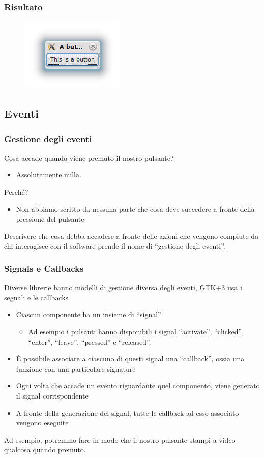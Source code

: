 \documentclass{beamer}
\begin{document}
\begin{frame}
\frametitle{Risultato}
\begin{figure}
 \includegraphics[width=0.6\columnwidth]{img/2}
\end{figure}
\end{frame}


\subsection{Eventi}

\begin{frame}
\frametitle{Gestione degli eventi}
Cosa accade quando viene premuto il nostro pulsante?
\begin{itemize}
 \item Assolutamente nulla.
\end{itemize}
Perché?
\begin{itemize}
 \item Non abbiamo scritto da nessuna parte che cosa deve succedere a fronte della pressione del pulsante.
\end{itemize}
Descrivere che cosa debba accadere a fronte delle azioni che vengono compiute da chi interagisce con il software prende il nome di ``gestione degli eventi''.
\end{frame}

\begin{frame}
\frametitle{Signals e Callbacks}
Diverse librerie hanno modelli di gestione diversa degli eventi, GTK+3 usa i segnali e le callbacks
 \begin{itemize}
  \item Ciascun componente ha un insieme di ``signal''
  \begin{itemize}
   \item Ad esempio i pulsanti hanno disponibili i signal ``activate'', ``clicked'', ``enter'', ``leave'', ``pressed'' e ``released''.
  \end{itemize}
  \item È possibile associare a ciascuno di questi signal una ``callback'', ossia una funzione con una particolare signature
  \item Ogni volta che accade un evento riguardante quel componento, viene generato il signal corrispondente
  \item A fronte della generazione del signal, tutte le callback ad esso associato vengono eseguite
 \end{itemize}
Ad esempio, potremmo fare in modo che il nostro pulsante stampi a video qualcosa quando premuto.
\end{frame}
\end{document}
